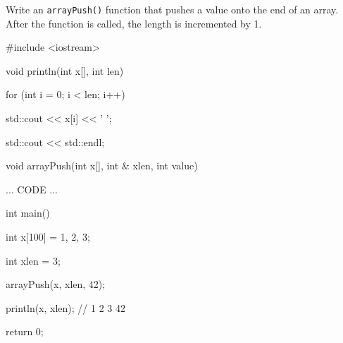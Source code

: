 Write an \texttt{arrayPush()} function that pushes a value onto the end of an array. After the function is called, the length is incremented by 1.



\begin{consolethree}[escapeinside=||]

#include <iostream>



void println(int x[], int len)

{

    for (int i = 0; i < len; i++)

    {

        std::cout << x[i] << ' ';

    }

    std::cout << std::endl;

}



void arrayPush(int x[], int & xlen, int value)

{

    ... CODE ...

}



int main()

{

    int x[100] = {1, 2, 3};

    int xlen = 3;

    arrayPush(x, xlen, 42);

    println(x, xlen); // 1 2 3 42

    return 0;

}

\end{consolethree}

